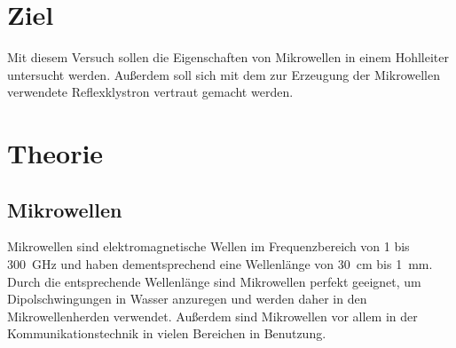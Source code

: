 \section*{Ziel}
    Mit diesem Versuch sollen die Eigenschaften von Mikrowellen in einem Hohlleiter untersucht werden.
    Außerdem soll sich mit dem zur Erzeugung der Mikrowellen verwendete Reflexklystron vertraut gemacht werden.
\section{Theorie}
    \label{sec:theorie}
    \subsection{Mikrowellen}
    \label{sec:mikrowellen}
        Mikrowellen sind elektromagnetische Wellen im Frequenzbereich von \num{1} bis \SI{300}{\giga\hertz} und haben dementsprechend eine Wellenlänge von \SI{30}{\centi\metre} bis \SI{1}{\milli\metre}.
        Durch die entsprechende Wellenlänge sind Mikrowellen perfekt geeignet, um Dipolschwingungen in Wasser anzuregen und werden daher in den Mikrowellenherden verwendet.
        Außerdem sind Mikrowellen vor allem in der Kommunikationstechnik in vielen Bereichen in Benutzung.
